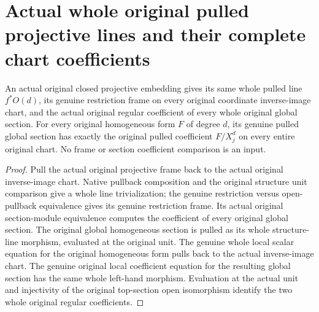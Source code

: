 \section{Actual whole original pulled projective lines and their complete chart coefficients}
\label{sec:native-pulled-projective-line-frames}

\begin{theorem}
\label{thm:native-pulled-projective-line-frames}
\leanok
{}
An actual original closed projective embedding gives its same whole
pulled line $f^*O(d)$, its genuine restriction frame on every original
coordinate inverse-image chart, and the actual original regular coefficient
of every whole original global section. For every original homogeneous form
$F$ of degree $d$, its genuine pulled global section has exactly the original
pulled coefficient $F/X_j^d$ on every entire original chart. No frame or
section coefficient comparison is an input.
\end{theorem}
\begin{proof}
Pull the actual original projective frame back to the actual original
inverse-image chart. Native pullback composition and the original structure
unit comparison give a whole line trivialization; the genuine restriction
versus open-pullback equivalence gives its genuine restriction frame. Its
actual original section-module equivalence computes the coefficient of
every original global section. The original global homogeneous section is
pulled as its whole structure-line morphism, evaluated at the original unit.
The genuine whole local scalar equation for the original homogeneous form
pulls back to the actual inverse-image chart. The genuine original local
coefficient equation for the resulting global section has the same whole
left-hand morphism. Evaluation at the actual unit and injectivity of the
original top-section open isomorphism identify the two whole original
regular coefficients.
\end{proof}


